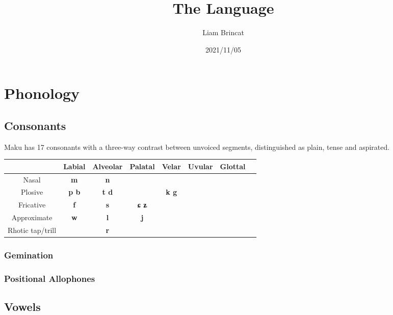 \documentclass{article}
\title{The \name Language}
\date{2021/11/05}
\author{Liam Brincat}
\newcommand\name{Maku }
\begin{document}
    \maketitle
    \newpage

    \doublespacing
    \tableofcontents
    \doublespacing
    \newpage
    \section{Phonology}
    

    \subsection{Consonants}
        \name has 17 consonants with a three-way contrast between unvoiced segments, distinguished as plain, tense and aspirated.  

        \begin{center}
            \begin{tabular}{|c||c|c|c|c|c|c|c|}
            \hline
            & Labial & Alveolar & Palatal & Velar & Uvular & Glottal \\ 
            \hline
                Nasal & \textbf{\Large{m}} & \textbf{\Large{n}} & & & &\\  
            \hline
                Plosive & \textbf{\Large{p b}} & \textbf{\Large{t d}} & & \textbf{\Large{k g}} & & \\
            \hline
                Fricative & \textbf{\Large{f}} & \textbf{\Large{s}} & \textbf{\Large{ɕ ʑ}} & & &\\
            \hline
                Approximate & \textbf{\Large{w}} & \textbf{\Large{l}} & \textbf{\Large{j}} & & & \\
            \hline
                Rhotic tap/trill & & \textbf{\Large{r}} & & & & \\
            \hline
        \end{tabular}
        \end{center}

    \subsubsection{Gemination}
    \subsubsection{Positional Allophones}
    \subsection{Vowels}
    
\end{document}
